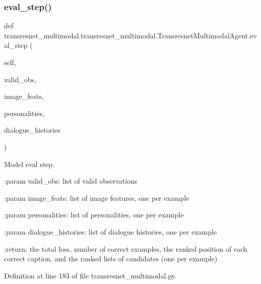 \mbox{\label{classtransresnet__multimodal_1_1transresnet__multimodal_1_1TransresnetMultimodalAgent_ac38417de9a1c4f653bffeb852dac0a7d}} 
\subsubsection{\texorpdfstring{eval\+\_\+step()}{eval\_step()}}
{\footnotesize\ttfamily def transresnet\+\_\+multimodal.\+transresnet\+\_\+multimodal.\+Transresnet\+Multimodal\+Agent.\+eval\+\_\+step (\begin{DoxyParamCaption}\item[{}]{self,  }\item[{}]{valid\+\_\+obs,  }\item[{}]{image\+\_\+feats,  }\item[{}]{personalities,  }\item[{}]{dialogue\+\_\+histories }\end{DoxyParamCaption})}

\begin{DoxyVerb}Model eval step.

:param valid_obs:
    list of valid observations

:param image_feats:
    list of image features, one per example

:param personalities:
    list of personalities, one per example

:param dialogue_histories:
    list of dialogue histories, one per example

:return:
    the total loss, number of correct examples,
    the ranked position of each correct caption,
    and the ranked lists of candidates (one per example)
\end{DoxyVerb}
 

Definition at line 183 of file transresnet\+\_\+multimodal.\+py.




